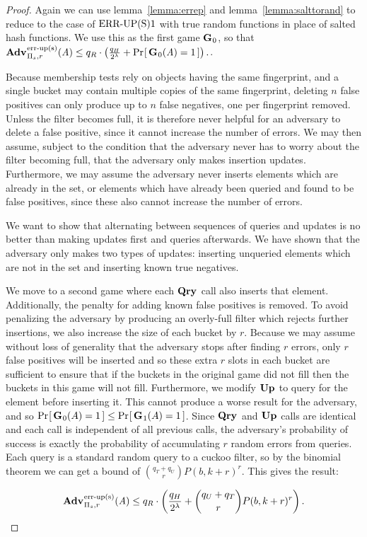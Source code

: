 \begin{proof}
Again we can use lemma~\ref{lemma:errep} and lemma~\ref{lemma:salttorand} to reduce to the case of $\textnormal{ERR\mbox{-}UP(S)}1$ with true random functions in place of salted hash functions. We use this as the first game $\mathbf{G}\hspace{0.5pt}_0$, so that $\Adv{\erreps}_{\struct_s,r}(\advA) \le q_R \cdot \left(\frac{q_H}{2^\lambda} + \Prob{\G_0(\advA) = 1}\right).$.

Because membership tests rely on objects having the same fingerprint, and a single bucket may contain multiple copies of the same fingerprint, deleting $n$ false positives can only produce up to $n$ false negatives, one per fingerprint removed. Unless the filter becomes full, it is therefore never helpful for an adversary to delete a false positive, since it cannot increase the number of errors. We may then assume, subject to the condition that the adversary never has to worry about the filter becoming full, that the adversary only makes insertion updates. Furthermore, we may assume the adversary never inserts elements which are already in the set, or elements which have already been queried and found to be false positives, since these also cannot increase the number of errors.

We want to show that alternating between sequences of queries and updates is no better than making updates first and queries afterwards. We have shown that the adversary only makes two types of updates: inserting unqueried elements which are not in the set and inserting known true negatives.

We move to a second game where each $\mathbf{Qry}\hspace{0.5pt}$ call also inserts that element. Additionally, the penalty for adding known false positives is removed. To avoid penalizing the adversary by producing an overly-full filter which rejects further insertions, we also increase the size of each bucket by $r$. Because we may assume without loss of generality that the adversary stops after finding $r$ errors, only $r$ false positives will be inserted and so these extra $r$ slots in each bucket are sufficient to ensure that if the buckets in the original game did not fill then the buckets in this game will not fill. Furthermore, we modify $\mathbf{Up}\hspace{0.5pt}$ to query for the element before inserting it. This cannot produce a worse result for the adversary, and so $\Pr\hspace{-1pt}\left[\,\mathbf{G}\hspace{0.5pt}_0(A) = 1\,\right] \le \Pr\hspace{-1pt}\left[\,\mathbf{G}\hspace{0.5pt}_1(A) = 1\,\right]$. Since $\mathbf{Qry}\hspace{0.5pt}$ and $\mathbf{Up}\hspace{0.5pt}$ calls are identical and each call is independent of all previous calls, the adversary's probability of success is exactly the probability of accumulating $r$ random errors from queries. Each query is a standard random query to a cuckoo filter, so by the binomial theorem we can get a bound of $\binom{q_T+q_U}{r}P(b,k+r)^r$. This gives the result:

$$\Adv{\erreps}_{\struct_s,r}(\advA) \le q_R \cdot \left(\frac{q_H}{2^\lambda} + \binom{q_U+q_T}{r}P(b,k+r)^r\right).$$\missingqed

\end{proof}